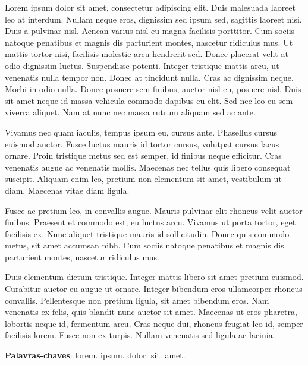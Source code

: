 \documentclass[
	12pt,				%
	openright,			%
	oneside,			%
	a4paper,			%
	english,			%
	french,				%
	spanish,			%
	brazil				%
	]{abntex2}
\begin{document}
\setlength{\absparsep}{18pt}
\begin{resumo}
Lorem ipsum dolor sit amet, consectetur adipiscing elit. Duis malesuada laoreet leo at interdum. Nullam neque eros, dignissim sed ipsum sed, sagittis laoreet nisi. Duis a pulvinar nisl. Aenean varius nisl eu magna facilisis porttitor. Cum sociis natoque penatibus et magnis dis parturient montes, nascetur ridiculus mus. Ut mattis tortor nisi, facilisis molestie arcu hendrerit sed. Donec placerat velit at odio dignissim luctus. Suspendisse potenti. Integer tristique mattis arcu, ut venenatis nulla tempor non. Donec at tincidunt nulla. Cras ac dignissim neque. Morbi in odio nulla. Donec posuere sem finibus, auctor nisl eu, posuere nisl. Duis sit amet neque id massa vehicula commodo dapibus eu elit. Sed nec leo eu sem viverra aliquet. Nam at nunc nec massa rutrum aliquam sed ac ante.

Vivamus nec quam iaculis, tempus ipsum eu, cursus ante. Phasellus cursus euismod auctor. Fusce luctus mauris id tortor cursus, volutpat cursus lacus ornare. Proin tristique metus sed est semper, id finibus neque efficitur. Cras venenatis augue ac venenatis mollis. Maecenas nec tellus quis libero consequat suscipit. Aliquam enim leo, pretium non elementum sit amet, vestibulum ut diam. Maecenas vitae diam ligula.

Fusce ac pretium leo, in convallis augue. Mauris pulvinar elit rhoncus velit auctor finibus. Praesent et commodo est, eu luctus arcu. Vivamus ut porta tortor, eget facilisis ex. Nunc aliquet tristique mauris id sollicitudin. Donec quis commodo metus, sit amet accumsan nibh. Cum sociis natoque penatibus et magnis dis parturient montes, nascetur ridiculus mus.

Duis elementum dictum tristique. Integer mattis libero sit amet pretium euismod. Curabitur auctor eu augue ut ornare. Integer bibendum eros ullamcorper rhoncus convallis. Pellentesque non pretium ligula, sit amet bibendum eros. Nam venenatis ex felis, quis blandit nunc auctor sit amet. Maecenas ut eros pharetra, lobortis neque id, fermentum arcu. Cras neque dui, rhoncus feugiat leo id, semper facilisis lorem. Fusce non ex turpis. Nullam venenatis sed ligula ac lacinia.

\textbf{Palavras-chaves}: lorem. ipsum. dolor. sit. amet.
\end{resumo}

\listoffigures*
\cleardoublepage
\end{document}
